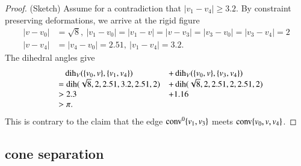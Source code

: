 \begin{proof} (Sketch) Assume for a contradiction that $|v_1-v_4|\ge 3.2$.
By
constraint preserving deformations, we arrive at the rigid figure
    $$
    \begin{array}{lll}
    |v-v_0|&=\sqrt{8},\ |v_1-v_0|=|v_1-v|=|v-v_3|=|v_3-v_0|=|v_3-v_4|=2
    \\ |v-v_4|&=|v_4-v_0|=2.51,\ |v_1-v_4|=3.2.
    \end{array}
    $$
The dihedral angles give
    $$
    \begin{array}{rll}
    &\phantom{=}\operatorname{dih}_V(\{v_0,v\},\{v_1,v_4\}) &+ \operatorname{dih}_V(\{v_0,v\},\{v_3,v_4\})\\
    &= \operatorname{dih}(\sqrt{8},2,2.51,3.2,2.51,2) &+
    \operatorname{dih}(\sqrt{8},2,2.51,2,2.51,2)\\
    &> 2.3 &+ 1.16 \\
    &>\pi.
    \end{array}
    $$
This is contrary to the claim that the edge
${\operatorname{conv}}^0\{v_1,v_3\}$ meets ${\operatorname{conv}}\{v_0,v,v_4\}$.
\end{proof}

\newpage




\subsection{cone separation}


